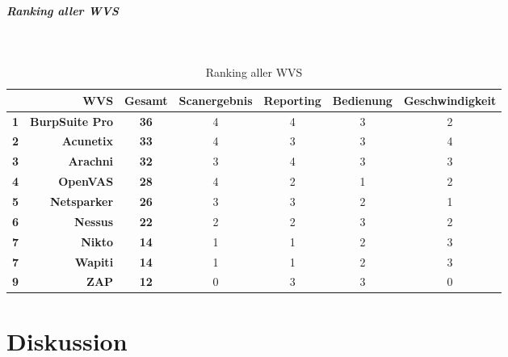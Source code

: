 \documentclass[12pt,oneside,a4paper,parskip,pointlessnumbers]{scrbook}
\begin{document}
     \paragraph{Ranking aller WVS}
     \
     \begin{table}[H]
  \begin{tabular}{|r|r|c|c|c|c|c|}
 \cline{2-7}
 \multicolumn{1}{l|}{} & \textbf{WVS}           & \textbf{Gesamt} & Scanergebnis & Reporting & Bedienung & Geschwindigkeit  \\
 \hline
 \textbf{1}            & \textbf{BurpSuite Pro} & \textbf{36}     & 4            & 4         & 3         & 2                \\
 \hline
 \textbf{2}            & \textbf{Acunetix}      & \textbf{33}\footnotemark     & 4            & 3         & 3         & 4                \\
 \hline
 \textbf{3}            & \textbf{Arachni}       & \textbf{32}     & 3            & 4         & 3         & 3                \\
 \hline
 \textbf{4}            & \textbf{OpenVAS}       & \textbf{28}     & 4            & 2         & 1         & 2                \\
 \hline
 \textbf{5}            & \textbf{Netsparker}    & \textbf{26}     & 3            & 3         & 2         & 1                \\
 \hline
 \textbf{6}            & \textbf{Nessus}        & \textbf{22}     & 2            & 2         & 3         & 2                \\
 \hline
 \textbf{7}            & \textbf{Nikto}         & \textbf{14}     & 1            & 1         & 2         & 3                \\
 \hline
 \textbf{7}            & \textbf{Wapiti}        & \textbf{14}     & 1            & 1         & 2         & 3                \\
 \hline
 \textbf{9}            & \textbf{ZAP}           & \textbf{12}     & 0            & 3         & 3         & 0                \\
 \hline
 \end{tabular}
 \caption[Ranking aller WVS]{Ranking aller WVS}
 \end{table}

\chapter{Diskussion}
\end{document}
